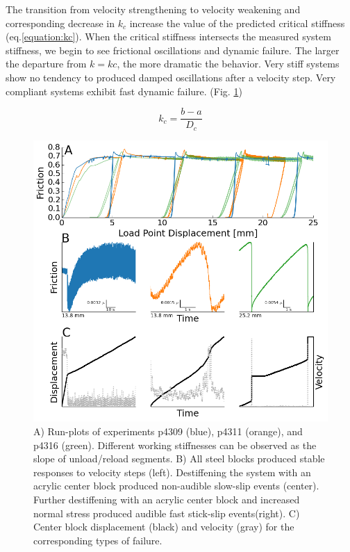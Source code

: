 \documentclass[11pt]{article}
\begin{document}
The transition from velocity strengthening to velocity weakening and
corresponding decrease in $k_c$ increase the value of the predicted critical
stiffness (eq.\ref{equation:kc}). When the critical stiffness intersects the
measured system stiffness, we begin to see frictional oscillations and dynamic
failure. The larger the departure from $k=kc$, the more dramatic the behavior.
Very stiff systems show no tendency to produced damped oscillations after a
velocity step. Very compliant systems exhibit fast dynamic failure. (Fig.
\ref{Figure:Runplot})

\begin{equation}
    k_c = \frac{b-a}{D_c}
	\label{equation:kc}
\end{equation}

\begin{figure}
	\centering
		\includegraphics[scale=0.7]{../Figures/Fig_Runplot/runplot.png}
   	\caption{A) Run-plots of experiments p4309 (blue), p4311 (orange), and p4316
   	(green). Different working stiffnesses can be observed as the slope of
   	unload/reload segments. B) All steel blocks produced stable responses to
   	velocity steps (left). Destiffening the system with an acrylic center block
   	produced non-audible slow-slip events (center). Further destiffening with an
   	acrylic center block and increased normal stress produced audible fast
   	stick-slip events(right). C) Center block displacement (black) and velocity
   	(gray) for the corresponding types of failure.}
  	\label{Figure:Runplot}
\end{figure}
\end{document}
